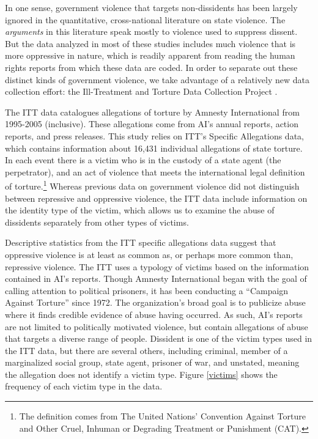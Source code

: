 \documentclass[12pt]{article}
\begin{document}
In one sense, government violence that targets non-dissidents has been largely ignored in the quantitative, cross-national literature on state violence. The {\em arguments} in this literature speak mostly to violence used to suppress dissent. But the data analyzed in most of these studies includes much violence that is more oppressive in nature, which is readily apparent from reading the human rights reports from which these data are coded. In order to separate out these distinct kinds of government violence, we take advantage of a relatively new data collection effort: the Ill-Treatment and Torture Data Collection Project \citep{ConradHaglundMoore2014}. 

The ITT data catalogues allegations of torture by Amnesty International from 1995-2005 (inclusive). These allegations come from AI's annual reports, action reports, and press releases. This study relies on ITT's Specific Allegations data, which contains information about 16,431 individual allegations of state torture. In each event there is a victim who is in the custody of a state agent (the perpetrator), and an act of violence that meets the international legal definition of torture.\footnote{The definition comes from The United Nations' Convention Against Torture and Other Cruel, Inhuman or Degrading Treatment or Punishment (CAT).} Whereas previous data on government violence did not distinguish between repressive and oppressive violence, the ITT data include information on the identity type of the victim, which allows us to examine the abuse of dissidents separately from other types of victims. 

Descriptive statistics from the ITT specific allegations data suggest that oppressive violence is at least as common as, or perhaps more common than, repressive violence. The ITT uses a typology of victims based on the information contained in AI's reports. Though Amnesty International began with the goal of calling attention to political prisoners, it has been conducting a ``Campaign Against Torture'' since 1972. The organization's broad goal is to publicize abuse where it finds credible evidence of abuse having occurred. As such, AI's reports are not limited to politically motivated violence, but contain allegations of abuse that targets a diverse range of people. Dissident is one of the victim types used in the ITT data, but there are several others, including criminal, member of a marginalized social group, state agent, prisoner of war, and unstated, meaning the allegation does not identify a victim type. Figure \ref{victims} shows the frequency of each victim type in the data. 
\end{document}
